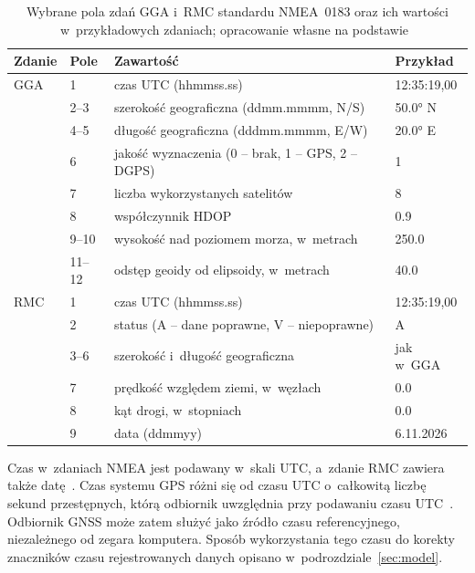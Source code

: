 \begin{table}[H]
  \centering
  \caption{Wybrane pola zdań GGA i~RMC standardu NMEA~0183 oraz ich wartości w~przykładowych zdaniach; opracowanie własne na podstawie~\cite{gpsd_nmea}}
  \label{tab:nmea}
  \begin{tabular}{@{}llll@{}}
    \toprule
    Zdanie & Pole & Zawartość & Przykład \\
    \midrule
    GGA & 1      & czas UTC (hhmmss.ss)                         & 12:35:19,00 \\
        & 2--3   & szerokość geograficzna (ddmm.mmmm, N/S)       & \ang{50.0} N \\
        & 4--5   & długość geograficzna (dddmm.mmmm, E/W)        & \ang{20.0} E \\
        & 6      & jakość wyznaczenia (0 -- brak, 1 -- GPS, 2 -- DGPS) & 1 \\
        & 7      & liczba wykorzystanych satelitów               & 8 \\
        & 8      & współczynnik HDOP                             & \num{0.9} \\
        & 9--10  & wysokość nad poziomem morza, w~metrach        & \num{250.0} \\
        & 11--12 & odstęp geoidy od elipsoidy, w~metrach         & \num{40.0} \\
    \midrule
    RMC & 1      & czas UTC (hhmmss.ss)                         & 12:35:19,00 \\
        & 2      & status (A -- dane poprawne, V -- niepoprawne)  & A \\
        & 3--6   & szerokość i~długość geograficzna              & jak w~GGA \\
        & 7      & prędkość względem ziemi, w~węzłach            & \num{0.0} \\
        & 8      & kąt drogi, w~stopniach                        & \num{0.0} \\
        & 9      & data (ddmmyy)                                 & 6.11.2026 \\
    \bottomrule
  \end{tabular}
\end{table}

Czas w~zdaniach NMEA jest podawany w~skali UTC, a~zdanie RMC zawiera także datę~\cite{gpsd_nmea}.
Czas systemu GPS różni się od czasu UTC o~całkowitą liczbę sekund przestępnych, którą odbiornik uwzględnia przy podawaniu czasu UTC~\cite{hofmann2008}.
Odbiornik GNSS może zatem służyć jako źródło czasu referencyjnego, niezależnego od zegara komputera. Sposób wykorzystania tego czasu do korekty znaczników czasu rejestrowanych danych opisano w~podrozdziale~\ref{sec:model}.


